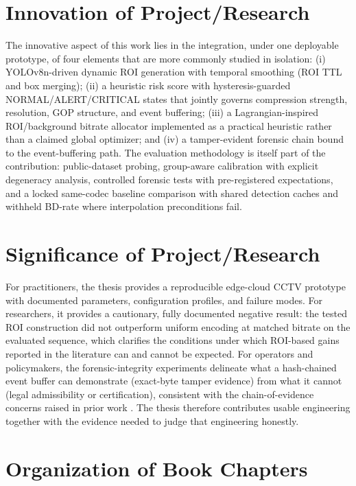 \section{Innovation of Project/Research}

The innovative aspect of this work lies in the integration, under one deployable prototype, of four elements that are more commonly studied in isolation: (i) YOLOv8n-driven dynamic ROI generation with temporal smoothing (ROI TTL and box merging); (ii) a heuristic risk score with hysteresis-guarded NORMAL/ALERT/CRITICAL states that jointly governs compression strength, resolution, GOP structure, and event buffering; (iii) a Lagrangian-inspired ROI/background bitrate allocator implemented as a practical heuristic rather than a claimed global optimizer; and (iv) a tamper-evident forensic chain bound to the event-buffering path. The evaluation methodology is itself part of the contribution: public-dataset probing, group-aware calibration with explicit degeneracy analysis, controlled forensic tests with pre-registered expectations, and a locked same-codec baseline comparison with shared detection caches and withheld BD-rate where interpolation preconditions fail.

\section{Significance of Project/Research}

For practitioners, the thesis provides a reproducible edge-cloud CCTV prototype with documented parameters, configuration profiles, and failure modes. For researchers, it provides a cautionary, fully documented negative result: the tested ROI construction did not outperform uniform encoding at matched bitrate on the evaluated sequence, which clarifies the conditions under which ROI-based gains reported in the literature \cite{Wu2024ROIDVC,Wu2025How2Compress,Wang2025CAVC} can and cannot be expected. For operators and policymakers, the forensic-integrity experiments delineate what a hash-chained event buffer can demonstrate (exact-byte tamper evidence) from what it cannot (legal admissibility or certification), consistent with the chain-of-evidence concerns raised in prior work \cite{Kanwal2020Chain}. The thesis therefore contributes usable engineering together with the evidence needed to judge that engineering honestly.

\section{Organization of Book Chapters}

